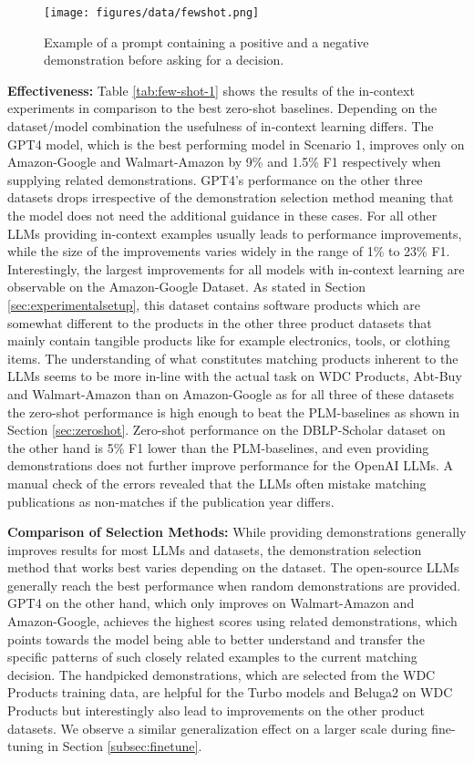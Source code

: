 \documentclass[sigconf,nonacm]{acmart}
\begin{document}
\begin{figure}[h]
  \centering
  \texttt{[image: figures/data/fewshot.png]}
  \caption{Example of a prompt containing a positive and a negative demonstration before asking for a decision.}
  \label{fig:fewshot}
\end{figure} 
\textbf{Effectiveness:} Table \ref{tab:few-shot-1} shows the results of the in-context experiments in comparison to the best zero-shot baselines. Depending on the dataset/model combination the usefulness of in-context learning differs. The GPT4 model, which is the best performing model in Scenario 1, improves only on Amazon-Google and Walmart-Amazon by 9\% and 1.5\% F1 respectively when supplying related demonstrations. GPT4's performance on the other three datasets drops irrespective of the demonstration selection method meaning that the model does not need the additional guidance in these cases. For all other LLMs providing in-context examples usually leads to performance improvements, while the size of the improvements varies widely in the range of  1\% to 23\% F1.
Interestingly, the largest improvements for all models with in-context learning are observable on the Amazon-Google Dataset. As stated in Section \ref{sec:experimentalsetup}, this dataset contains software products which are somewhat different to the products in the other three product datasets that mainly contain tangible products like for example electronics, tools, or clothing items. The understanding of what constitutes matching products inherent to the LLMs seems to be more in-line with the actual task on WDC Products, Abt-Buy and Walmart-Amazon than on Amazon-Google as for all three of these datasets the zero-shot performance is high enough to beat the PLM-baselines as shown in Section \ref{sec:zeroshot}. Zero-shot performance on the DBLP-Scholar dataset on the other hand is 5\% F1 lower than the PLM-baselines, and even providing demonstrations does not further improve performance for the OpenAI LLMs. A manual check of the errors revealed that the LLMs often mistake matching publications as non-matches if the publication year differs. 

\textbf{Comparison of Selection Methods:} While providing demonstrations generally improves results for most LLMs and datasets, the demonstration selection method that works best varies depending on the dataset. The open-source LLMs generally reach the best performance when random demonstrations are provided. GPT4 on the other hand, which only improves on Walmart-Amazon and Amazon-Google, achieves the highest scores using related demonstrations, which points towards the model being able to better understand and transfer the specific patterns of such closely related examples to the current matching decision.
The handpicked demonstrations, which are selected from the WDC Products training data, are helpful for the Turbo models and Beluga2 on WDC Products but interestingly also lead to improvements on the other product datasets. We observe a similar generalization effect on a larger scale during fine-tuning in Section \ref{subsec:finetune}.
\end{document}
